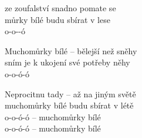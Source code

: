 
\ve{}
 ze zoufalství snadno pomate se\\
můrky bílé budu sbírat v lese\\
o-o--ó 

\ve{}
Muchomůrky bílé -- bělejší než sněhy\\
sním je k ukojení své potřeby něhy\\
o-o-ó-ó

\ve{}
Neprocitnu tady -- až na jiným světě\\
muchomůrky bílé budu sbírat v létě\\
o-o-ó-ó -- muchomůrky bílé\\
o-o-ó-ó -- muchomůrky bílé 

\esong{}